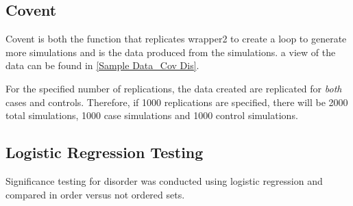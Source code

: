 \subsection{Covent}
Covent is both the function that replicates wrapper2 to create a loop to generate more simulations and is the data produced from the simulations. a view of the data can be found in \ref{Sample Data_Cov Dis}. 

For the specified number of replications, the data created are replicated for \emph{both} cases and controls. Therefore, if 1000 replications are specified, there will be 2000 total simulations, 1000 case simulations and 1000 control simulations. 

\subsection{Logistic Regression Testing}
Significance testing for disorder was conducted using logistic regression and compared in order versus not ordered sets. 



